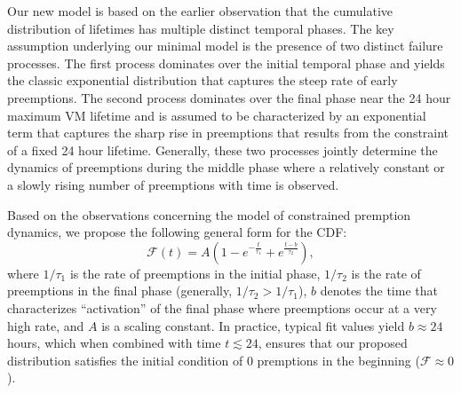 Our new model is based on the earlier observation that the cumulative distribution of lifetimes has multiple distinct temporal phases. The key assumption underlying our minimal model is the presence of two distinct failure processes.
The first process dominates over the initial temporal phase and yields the classic exponential distribution that captures the steep rate of early preemptions. The second process dominates over the final phase near the 24 hour maximum VM lifetime and is assumed to be characterized by an exponential term that captures the sharp rise in preemptions that results from the constraint of a fixed 24 hour lifetime. Generally, these two processes jointly determine the dynamics of preemptions during the middle phase where a relatively constant or a slowly rising number of preemptions with time is observed.

%
%

Based on the observations concerning the model of constrained premption dynamics, we propose the following general form for the CDF:
\begin{equation}
  \label{eq:blend1}
  \mathscr{F}\left(t\right) = A\left(1-e^{-\frac{t}{\tau_1}} + e^{\frac{t-b}{\tau_2}}\right),
\end{equation}
where $1/\tau_1$ is the rate of preemptions in the initial phase, $1/\tau_2$ is the rate of preemptions in the final phase (generally, $1/\tau_2 > 1/\tau_1$), $b$ denotes the time that characterizes ``activation'' of the final phase where preemptions occur at a very high rate, and $A$ is a scaling constant. In practice, typical fit values yield $b \approx 24$ hours, which when combined with time $t \lesssim 24$, ensures that our proposed distribution satisfies the initial condition of 0 premptions in the beginning ($\mathscr{F} \approx 0$).

